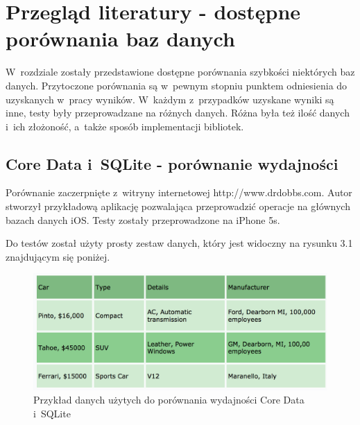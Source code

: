 \section{Przegląd literatury - dostępne porównania baz danych}

 W~rozdziale zostały przedstawione dostępne porównania szybkości niektórych baz danych. Przytoczone porównania są w~pewnym stopniu punktem odniesienia do uzyskanych w~pracy wyników. W~każdym z~przypadków uzyskane wyniki są inne, testy były przeprowadzane na różnych danych. Różna była też ilość danych i~ich złożoność, a~także sposób implementacji bibliotek. 

\subsection{Core Data i~SQLite - porównanie wydajności}

Porównanie zaczerpnięte z~witryny internetowej http://www.drdobbs.com. Autor stworzył przykładową aplikację pozwalająca przeprowadzić operacje na głównych bazach danych iOS. Testy zostały przeprowadzone na iPhone 5s. \par

Do testów został użyty prosty zestaw danych, który jest widoczny na rysunku 3.1 znajdującym się poniżej. 

\begin{figure}[h]
	\includegraphics[width=\linewidth]{img/coredata_sql_test.png}
	\caption{Przykład danych użytych do porównania wydajności Core Data i~SQLite}
	\label{fig: CoreData_SQLite_test_data}
\end{figure}

